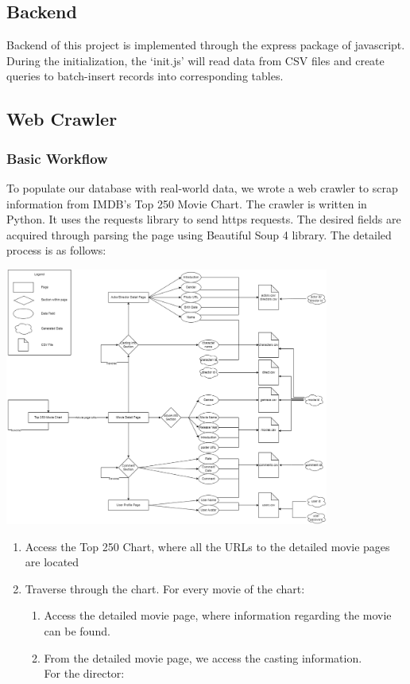 \begin{CJK*}{UTF8}{gbsn}
\subsection{Backend}
Backend of this project is implemented through the express package of javascript. During the initialization, the `init.js' will read data from CSV files and create queries to batch-insert records into corresponding tables.
\subsection{Web Crawler}
\subsubsection{Basic Workflow}
To populate our database with real-world data, we wrote a web crawler to scrap information from IMDB's Top 250 Movie Chart. The crawler is written in Python. It uses the requests library to send https requests. The desired fields are acquired through parsing the page using Beautiful Soup 4 library.
The detailed process is as follows:\par
\includegraphics[width=0.8\textwidth]{crawler_flowchart.png}
\begin{enumerate}
    \item Access the Top 250 Chart, where all the URLs to the detailed movie pages are located
    \item Traverse through the chart. For every movie of the chart:
    \begin{enumerate}
        \item Access the detailed movie page, where information regarding the movie can be found.
        \item From the detailed movie page, we access the casting information.\\ For the director:

\end{enumerate}
\end{enumerate}
\end{CJK*}
